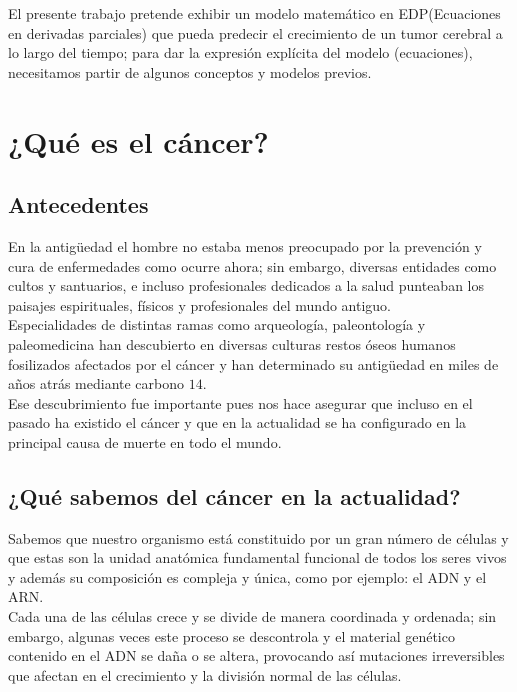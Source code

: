 El presente trabajo pretende exhibir un modelo matemático en EDP(Ecuaciones en derivadas parciales) que pueda predecir el crecimiento de un tumor cerebral a lo largo del tiempo; para dar la expresión explícita del modelo (ecuaciones), necesitamos partir de algunos conceptos y modelos previos.\\

\section{¿Qué es el cáncer?}

\subsection{Antecedentes}

En la antig\"uedad el hombre no estaba menos preocupado por la prevención y cura de enfermedades como ocurre ahora; sin embargo,
diversas entidades como cultos y santuarios, e incluso profesionales dedicados a la salud punteaban los paisajes espirituales, físicos y
profesionales del mundo antiguo.\\

Especialidades de distintas ramas como arqueología, paleontología y paleomedicina han descubierto en diversas culturas restos óseos humanos fosilizados afectados por el cáncer y han determinado su antig\"uedad en miles de años atrás mediante carbono $14$.\\

Ese descubrimiento fue importante pues nos hace asegurar que incluso en el pasado ha existido el cáncer y que en la actualidad se ha configurado en la principal causa de muerte en todo el mundo.

\subsection{¿Qué sabemos del cáncer en la actualidad?}

Sabemos que nuestro organismo está constituido por un gran número de células y que estas son la unidad anatómica fundamental funcional de todos los seres vivos y además su composición es compleja y única, como por ejemplo: el ADN y el ARN.\\

Cada una de las células crece y se divide de manera coordinada y ordenada; sin embargo, algunas veces este proceso se descontrola y el material genético contenido en el ADN se daña o se altera, provocando así mutaciones irreversibles que afectan en el crecimiento y la división normal de las células.\\

